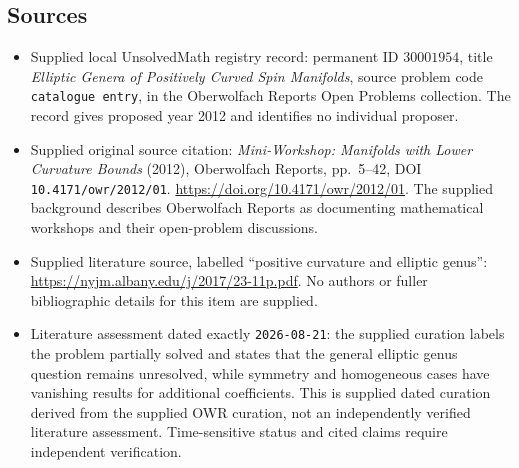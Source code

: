 \documentclass[11pt]{article}
\begin{document}
\subsection{Sources}
\begin{itemize}
\item Supplied local UnsolvedMath registry record: permanent ID \(30001954\), title \emph{Elliptic Genera of Positively Curved Spin Manifolds}, source problem code \texttt{catalogue entry}, in the Oberwolfach Reports Open Problems collection. The record gives proposed year 2012 and identifies no individual proposer.
\item Supplied original source citation: \emph{Mini-Workshop: Manifolds with Lower Curvature Bounds} (2012), Oberwolfach Reports, pp.~5--42, DOI \texttt{10.4171/owr/2012/01}. \url{https://doi.org/10.4171/owr/2012/01}. The supplied background describes Oberwolfach Reports as documenting mathematical workshops and their open-problem discussions.
\item Supplied literature source, labelled ``positive curvature and elliptic genus'': \url{https://nyjm.albany.edu/j/2017/23-11p.pdf}. No authors or fuller bibliographic details for this item are supplied.
\item Literature assessment dated exactly \texttt{2026-08-21}: the supplied curation labels the problem partially solved and states that the general elliptic genus question remains unresolved, while symmetry and homogeneous cases have vanishing results for additional coefficients. This is supplied dated curation derived from the supplied OWR curation, not an independently verified literature assessment. Time-sensitive status and cited claims require independent verification.
\end{itemize}
\end{document}
